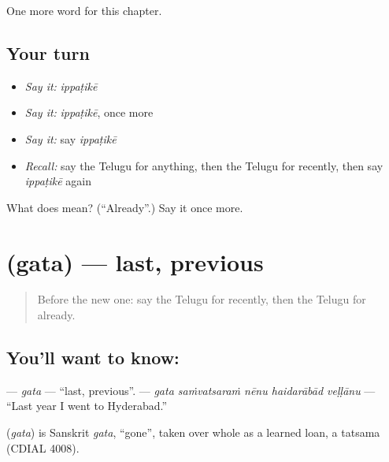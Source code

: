 \begin{grammarlens}[title={What you've built}]
One more word for this chapter.
\end{grammarlens}

\subsection*{Your turn}
\begin{itemize}
\raggedright
  \item \emph{Say it:} \emph{ippaṭikē}
  \item \emph{Say it:} \emph{ippaṭikē}, once more
  \item \emph{Say it:} say \emph{ippaṭikē}
  \item \emph{Recall:} say the Telugu for anything, then the Telugu for recently, then say \emph{ippaṭikē} again
\end{itemize}

\begin{tcolorbox}[breakable,colback=teal!4,colframe=teal!35!black,title={Before you move on}]
What does  mean? (\textquotedblleft{}Already\textquotedblright{}.) Say it once more.
\end{tcolorbox}
\section[\texorpdfstring{\te{గత} (gata)}{గత (gata)}]{ (gata) — last, previous}

\label{lesson:TE-C154-gata}



\begin{quote}
Before the new one: say the Telugu for recently, then the Telugu for already.
\end{quote}

\subsection*{You'll want to know: }
\textbf{} — \emph{gata} — \textquotedblleft{}last, previous\textquotedblright{}. \textbf{    } — \emph{gata saṁvatsaraṁ nēnu haidarābād veḷḷānu} — \textquotedblleft{}Last year I went to Hyderabad.\textquotedblright{}

\begin{cousinweb}
\textbf{} (\emph{gata}) is Sanskrit \emph{gata}, \textquotedblleft{}gone\textquotedblright{}, taken over whole as a learned loan, a tatsama (CDIAL 4008).
\end{cousinweb}

